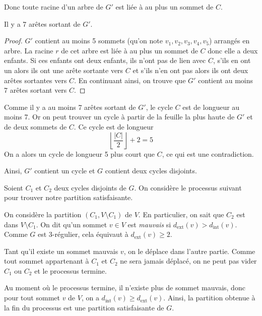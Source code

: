 Donc toute racine d'un arbre de \(G'\) est liée à au plus un sommet de \(C\).

\begin{proposition}
    Il y a 7 arêtes sortant de \(G'\).
\end{proposition}

\begin{proof}
    \(G'\) contient au moins 5 sommets (qu'on note \(v_1, v_2, v_3, v_4, v_5\)) arrangés en arbre.
    La racine \(r\) de cet arbre est liée à au plus un sommet de \(C\) donc elle a deux enfants.
    Si ces enfants ont deux enfants, ils n'ont pas de lien avec \(C\), s'ils en ont un alors ils ont une arête sortante vers \(C\) et s'ils n'en ont pas alors ils ont deux arêtes sortantes vers \(C\).
    En continuant ainsi, on trouve que \(G'\) contient au moins 7 arêtes sortant vers \(C\).
\end{proof}

Comme il y a au moins 7 arêtes sortant de \(G'\), le cycle \(C\) est de longueur au moins 7.
Or on peut trouver un cycle à partir de la feuille la plus haute de \(G'\) et de deux sommets de \(C\).
Ce cycle est de longueur
\begin{equation*}
    \left\lfloor \frac{|C|}{2} \right\rfloor + 2 = 5
\end{equation*}
On a alors un cycle de longueur 5 plus court que \(C\), ce qui est une contradiction.

Ainsi, \(G'\) contient un cycle et \(G\) contient deux cycles disjoints.

Soient \(C_1\) et \(C_2\) deux cycles disjoints de \(G\).
On considère le processus suivant pour trouver notre partition satisfaisante.

On considère la partition \((C_1, V \setminus C_1)\) de \(V\). En particulier, on sait que \(C_2\) est dans \(V \setminus C_1\).
On dit qu’un sommet \(v \in V\) est \emph{mauvais} si \(d_{\mathrm{ext}}(v) > d_{\mathrm{int}}(v)\).
Comme \(G\) est \(3\)-régulier, cela équivaut à \(d_{\mathrm{ext}}(v) \geq 2\).

Tant qu'il existe un sommet mauvais \(v\), on le déplace dans l’autre partie. Comme tout sommet appartenant à \(C_1\) et \(C_2\) ne sera jamais déplacé, on ne peut pas vider \(C_1\) ou \(C_2\) et le processus termine.

Au moment où le processus termine, il n'existe plus de sommet mauvais, donc pour tout sommet \(v\) de \(V\), on a \(d_{\mathrm{int}}(v) \geq d_{\mathrm{ext}}(v)\).
Ainsi, la partition obtenue à la fin du processus est une partition satisfaisante de \(G\).

